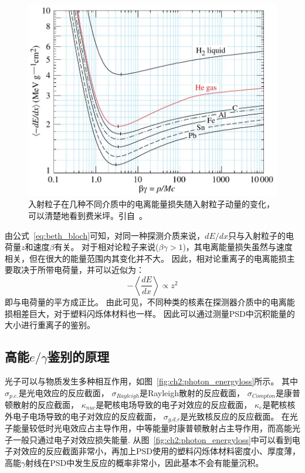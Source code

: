 \begin{figure}
\centering
\includegraphics[width=0.8\linewidth]{chap/description/fig/fermi_plateau}
\caption{入射粒子在几种不同介质中的电离能量损失随入射粒子动量的变化，可以清楚地看到费米坪。引自~\parencite{pdg_book}。}
\label{fig:ch2:fermi_plateau}
\end{figure}

由公式~\ref{eq:beth_bloch}可知，对同一种探测介质来说，$dE/dx$只与入射粒子的电荷量$z$和速度$\beta$有关。
对于相对论粒子来说($\beta\gamma>1$)，其电离能量损失虽然与速度相关，但在很大的能量范围内其变化并不大。
因此，相对论重离子的电离能损主要取决于所带电荷量，并可以近似为：
\begin{equation}
-\left\langle\frac{dE}{dx}\right\rangle \propto z^2
\end{equation}
即与电荷量的平方成正比。
由此可见，不同种类的核素在探测器介质中的电离能损相差巨大，对于塑料闪烁体材料也一样。
因此可以通过测量PSD中沉积能量的大小进行重离子的鉴别。

\subsection{高能$e/\gamma$鉴别的原理}
光子可以与物质发生多种相互作用，如图~\ref{fig:ch2:photon_energyloss}所示。
其中${\sigma}_{p.e.}$是光电效应的反应截面，
${\sigma}_{Rayleigh}$是Rayleigh散射的反应截面， 
${\sigma}_{Compton}$是康普顿散射的反应截面，
${\kappa}_{nuc}$是靶核电场导致的电子对效应的反应截面，
${\kappa}_e$是靶核核外电子电场导致的电子对效应的反应截面，
${\sigma}_{g.d.r}$是光致核反应的反应截面。
在光子能量较低时光电效应占主导作用，中等能量时康普顿散射占主导作用，而高能光子一般只通过电子对效应损失能量.
从图~\ref{fig:ch2:photon_energyloss}中可以看到电子对效应的反应截面非常小，再加上PSD使用的塑料闪烁体材料密度小、厚度薄，高能$\gamma$射线在PSD中发生反应的概率非常小，因此基本不会有能量沉积。

